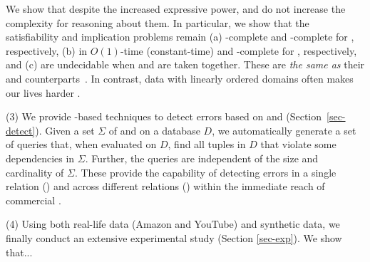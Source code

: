 We show that despite the increased expressive power,
\pCFDs and \pCINDs do not increase the complexity for
reasoning about them. In particular, we show that
the satisfiability and implication problems remain
(a) \NP-complete and \coNP-complete for \pCFDs, respectively,
(b) in $O(1)$-time (constant-time) and \EXPTIME-complete
for \pCINDs, respectively,
and (c) are undecidable when \pCFDs and \pCINDs are taken together.
These are {\em the same as} their \CFDs and \CINDs counterparts~\cite{tcs-CINDs}.
In contrast, data with linearly ordered domains often makes our lives harder \cite{Mayden97}. 


\sstab
\noindent(3) We provide \SQL-based techniques to detect errors
based on \pCFDs and \pCINDs (Section~\ref{sec-detect}). Given a set $\Sigma$ of {\pCFDs}
and \pCINDs on a database $D$, we automatically generate
a set of \SQL queries that, when evaluated on $D$, find all tuples in $D$ that
violate some dependencies in $\Sigma$. Further,
the \SQL queries are independent of the size and cardinality
of $\Sigma$.
These provide the capability of detecting errors in a single
relation (\pCFDs) and across different relations (\pCINDs)
within the immediate reach of commercial \rdms.


\sstab
\noindent(4) Using both real-life data (Amazon and YouTube) and synthetic data, we finally conduct
an extensive experimental study (Section \ref{sec-exp}). We show that...

